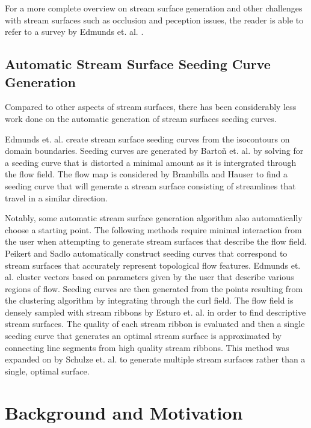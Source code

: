 \documentclass{vgtc}                          %
\begin{document}
For a more complete overview on stream surface generation and other challenges with stream surfaces such as occlusion and peception issues, the reader is able to refer to a survey by Edmunds et. al. \cite{Edmunds2012b}.

\subsection{Automatic Stream Surface Seeding Curve Generation}

Compared to other aspects of stream surfaces, there has been considerably less work done on the automatic generation of stream surfaces seeding curves.

Edmunds et. al. \cite{Edmunds2012} create stream surface seeding curves from the isocontours on domain boundaries.
Seeding curves are generated by Barto{\v{n}} et. al. \cite{Barton2015} by solving for a seeding curve that is distorted a minimal amount as it is intergrated through the flow field.
The flow map is considered by Brambilla and Hauser \cite{Brambilla2015} to find a seeding curve that will generate a stream surface consisting of streamlines that travel in a similar direction.

Notably, some automatic stream surface generation algorithm also automatically choose a starting point.
The following methods require minimal interaction from the user when attempting to generate stream surfaces that describe the flow field.
Peikert and Sadlo \cite{Peikert2009} automatically construct seeding curves that correspond to stream surfaces that accurately represent topological flow features.
Edmunds et. al. \cite{Edmunds2012a} cluster vectors based on parameters given by the user that describe various regions of flow.
Seeding curves are then generated from the points resulting from the clustering algorithm by integrating through the curl field.
The flow field is densely sampled with stream ribbons by Esturo et. al. \cite{Esturo2013} in order to find descriptive stream surfaces.
The quality of each stream ribbon is evaluated and then a single seeding curve that generates an optimal stream surface is approximated by connecting line segments from high quality stream ribbons.
This method was expanded on by Schulze et. al. \cite{Schulze2014} to generate multiple stream surfaces rather than a single, optimal surface.

\section{Background and Motivation} \label{sec:motivation}
\end{document}
